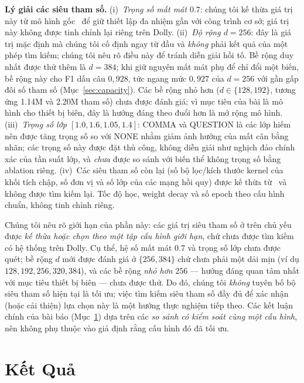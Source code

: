 \documentclass[conference,onecolumn]{IEEEtran}
\begin{document}
\textbf{Lý giải các siêu tham số.}\label{sec:hyper}
(i)~\emph{Trọng số mất mát $0.7$}: chúng tôi kế thừa giá trị này từ mô hình
gốc~\cite{you2024lightweight} để giữ thiết lập đa nhiệm gần với công trình cơ sở;
giá trị này không được tinh chỉnh lại riêng trên Dolly. (ii)~\emph{Độ rộng
$d=256$}: đây là giá trị mặc định mà chúng tôi cố định ngay từ đầu và \emph{không}
phải kết quả của một phép tìm kiếm; chúng tôi nêu rõ điều này để tránh diễn giải
hồi tố. Bề rộng duy nhất được thử thêm là $d=384$; khi giữ nguyên mất mát phụ để
chỉ đổi một biến, bề rộng này cho F1 dấu câu $0{,}928$, tức ngang mức $0{,}927$
của $d=256$ với gần gấp đôi số tham số (Mục~\ref{sec:capacity}).
Các bề rộng nhỏ hơn ($d\in\{128,192\}$, tương ứng 1.14M và 2.20M tham số) chưa được
đánh giá; vì mục tiêu của bài là mô hình cho thiết bị biên, đây là hướng đáng theo
đuổi hơn là mở rộng mô hình.
(iii)~\emph{Trọng số lớp $[1.0,1.6,1.05,1.4]$}: COMMA và QUESTION là các lớp hiếm
nên được tăng trọng số so với NONE nhằm giảm ảnh hưởng của mất cân bằng nhãn; các
trọng số này được đặt thủ công, không diễn giải như nghịch đảo chính xác của tần
suất lớp, và \emph{chưa} được so sánh với biến thể không trọng số bằng ablation
riêng. (iv)~Các siêu tham số còn lại (số bộ lọc/kích thước kernel của khối tích
chập, số đơn vị và số lớp của các mạng hồi quy) được kế thừa
từ~\cite{you2024lightweight} và không được tìm kiếm lại.
Tốc độ học, weight decay và số epoch theo cấu hình chuẩn, không tinh chỉnh riêng.

Chúng tôi nêu rõ giới hạn của phần này: các giá trị siêu tham số ở trên chủ yếu
được \emph{kế thừa hoặc chọn theo một tập cấu hình giới hạn}, chứ chưa được tìm
kiếm có hệ thống trên Dolly. Cụ thể, hệ số mất mát $0.7$ và trọng số lớp chưa được
quét; bề rộng $d$ mới được đánh giá ở $\{256, 384\}$ chứ chưa phải một dải mịn
(ví dụ $128,192,256,320,384$), và các bề rộng \emph{nhỏ hơn} $256$ --- hướng
đáng quan tâm nhất với mục tiêu thiết bị biên --- chưa được thử. Do đó, chúng tôi \emph{không} tuyên bố bộ siêu tham
số hiện tại là tối ưu; việc tìm kiếm siêu tham số đầy đủ để xác nhận (hoặc cải
thiện) lựa chọn này là một hướng thực nghiệm tiếp theo. Các kết luận chính của bài
báo (Mục~\ref{sec:results}) dựa trên các \emph{so sánh có kiểm soát cùng một cấu
hình}, nên không phụ thuộc vào giả định rằng cấu hình đó đã tối ưu.

\section{Kết Quả}
\label{sec:results}
\end{document}
